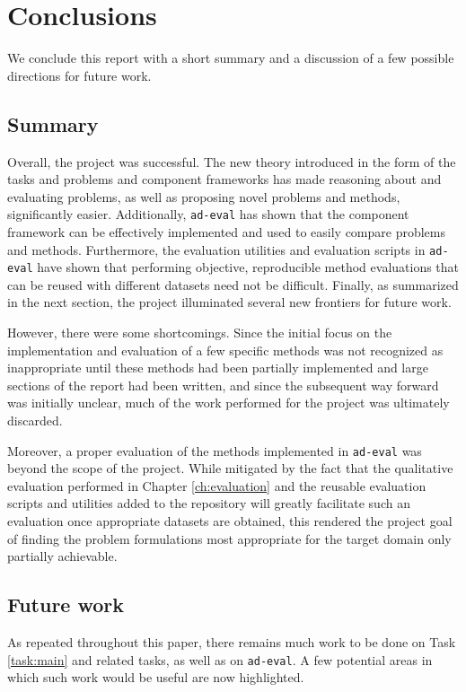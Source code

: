 \chapter{Conclusions}
\label{ch:conclusions}

We conclude this report with a short summary and a discussion of a few possible directions for future work.

\section{Summary}

Overall, the project was successful. The new theory introduced in the form of the tasks and problems and component frameworks has made reasoning about and evaluating problems, as well as proposing novel problems and methods, significantly easier. Additionally, \texttt{ad-eval} has shown that the component framework can be effectively implemented and used to easily compare problems and methods. Furthermore, the evaluation utilities and evaluation scripts in \texttt{ad-eval} have shown that performing objective, reproducible method evaluations that can be reused with different datasets need not be difficult. Finally, as summarized in the next section, the project illuminated several new frontiers for future work.

However, there were some shortcomings. Since the initial focus on the implementation and evaluation of a few specific methods was not recognized as inappropriate until these methods had been partially implemented and large sections of the report had been written, and since the subsequent way forward was initially unclear, much of the work performed for the project was ultimately discarded.

Moreover, a proper evaluation of the methods implemented in \texttt{ad-eval} was beyond the scope of the project. While mitigated by the fact that the qualitative evaluation performed in Chapter \ref{ch:evaluation} and the reusable evaluation scripts and utilities added to the repository will greatly facilitate such an evaluation once appropriate datasets are obtained, this rendered the project goal of finding the problem formulations most appropriate for the target domain only partially achievable.

\section{Future work}

As repeated throughout this paper, there remains much work to be done on Task \ref{task:main} and related tasks, as well as on \texttt{ad-eval}. A few potential areas in which such work would be useful are now highlighted.

